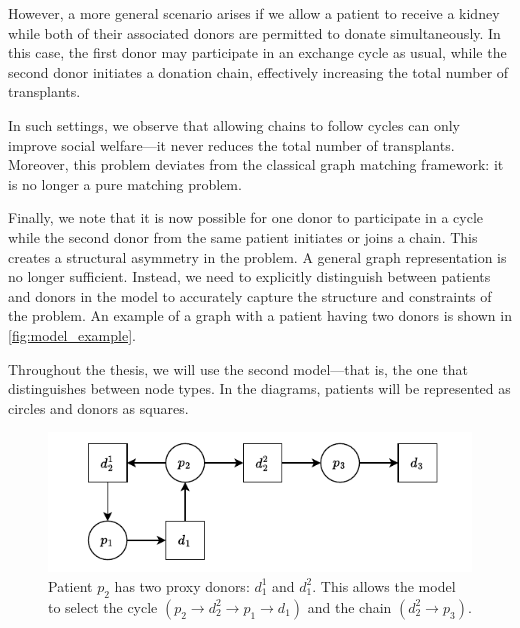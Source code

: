However, a more general scenario arises if we allow a patient to receive a kidney while both of their associated donors are permitted to donate simultaneously. In this case, the first donor may participate in an exchange cycle as usual, while the second donor initiates a donation chain, effectively increasing the total number of transplants. 

In such settings, we observe that allowing chains to follow cycles can only improve social welfare—it never reduces the total number of transplants. Moreover, this problem deviates from the classical graph matching framework: it is no longer a pure matching problem.


Finally, we note that it is now possible for one donor to participate in a cycle while the second donor from the same patient initiates or joins a chain. This creates a structural asymmetry in the problem. A general graph representation is no longer sufficient. Instead, we need to explicitly distinguish between patients and donors in the model to accurately capture the structure and constraints of the problem. An example of a graph with a patient having two donors is shown in \autoref{fig:model_example}.

Throughout the thesis, we will use the second model—that is, the one that distinguishes between node types. In the diagrams, patients will be represented as circles and donors as squares.

\begin{figure}
    \centering
    \includegraphics{data/model_example.pdf}
    \caption[An example of a graph with a patient having two donors]{Patient $p_2$ has two proxy donors: $d_1^1$ and $d_1^2$. This allows the model to select the cycle $(p_2 \rightarrow d_2^2 \rightarrow p_1 \rightarrow d_1)$ and the chain $(d_2^2 \rightarrow p_3)$.}
    \label{fig:model_example}
\end{figure}

